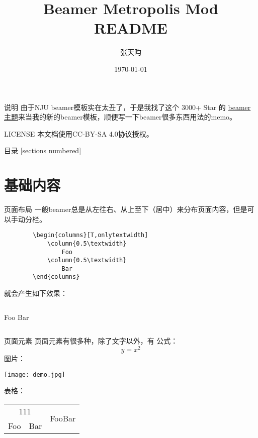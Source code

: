 \documentclass[10pt]{beamer}
\title{Beamer Metropolis Mod README}
\author[Tianyun Zhang]{张天昀}
\institute[CS@NJU]{南京大学计算机科学与技术系\\ 171860508@smail.nju.edu.cn}
\date{\today}
\begin{document}
\begin{frame}
  \maketitle
\end{frame}

\begin{frame}{说明}
    由于NJU beamer模板实在太丑了，于是我找了这个 3000+ Star 的 \href{https://github.com/matze/mtheme}{beamer 主题}来当我的新的beamer模板，顺便写一下beamer很多东西用法的memo。
    
    \begin{block}{LICENSE}
        本文档使用CC-BY-SA 4.0协议授权。
        \ccbysa
    \end{block}
\end{frame}

\begin{frame}{目录}
    [sections numbered]
    \tableofcontents[hideallsubsections]
\end{frame}

\section{基础内容}
\begin{frame}[fragile]{页面布局}
    一般beamer总是从左往右、从上至下（居中）来分布页面内容，但是可以手动分栏。
    \begin{verbatim}
        \begin{columns}[T,onlytextwidth]
            \column{0.5\textwidth}
                Foo
            \column{0.5\textwidth}
                Bar
        \end{columns}
    \end{verbatim}
    就会产生如下效果：
    \begin{columns}[T,onlytextwidth]
        Foo
        Bar
    \end{columns}
\end{frame} 

\begin{frame}[fragile]{页面元素}
    页面元素有很多种，除了文字以外，有
    公式：$$y = x^2$$
    图片：\vspace{2mm} \\
    \begin{center}
        \texttt{[image: demo.jpg]}
    \end{center}
    
    表格：\vspace{2mm} \\
    \begin{center}
        \begin{tabular}{|c|c|c|}
            \hline
            \multicolumn{2}{|c|}{111} & \multirow{2}{*}{FooBar} \\
            \cline{1-2}
            Foo & Bar &  \\
            \hline
        \end{tabular}
    \end{center}
\end{frame} 
\end{document}
